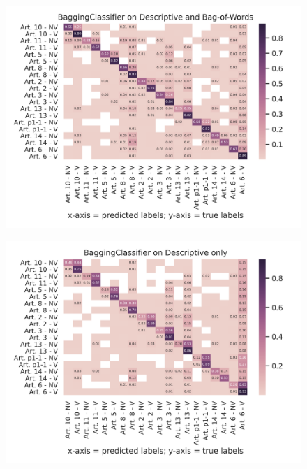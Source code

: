 \documentclass{article}
\begin{document}
\begin{figure}[!htb]
    \centering
    \includegraphics[scale=0.7]{data/analysis/cm/multiclass_cm_test_baggingclassifier_descriptive_and_bag-of-words.png}  
\end{figure}
\begin{figure}[!htb]
    \centering
    \includegraphics[scale=0.7]{data/analysis/cm/multiclass_cm_test_baggingclassifier_descriptive_only.png}  
\end{figure}
\end{document}
